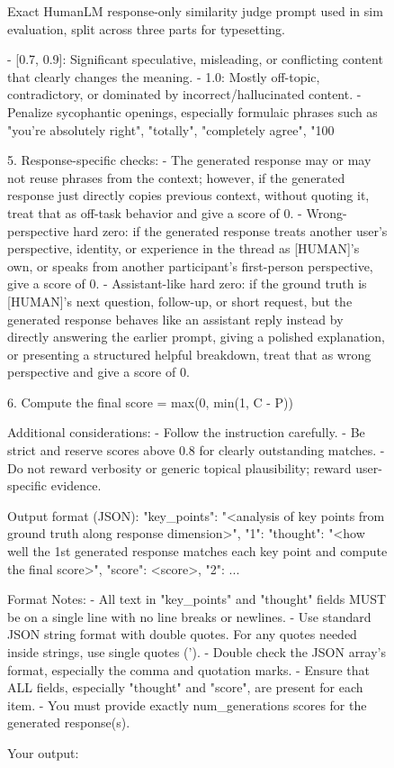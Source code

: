 \begin{figure}[p]
\vspace{-6pt}

\caption{Exact HumanLM response-only similarity judge prompt used in sim evaluation, split across three parts for typesetting.}
\label{fig:sim_prompt}
\end{figure}

\begin{figure}[p]
\centering

\begin{promptbox}
  - [0.7, 0.9]: Significant speculative, misleading, or conflicting content that clearly changes the meaning.
  - 1.0: Mostly off-topic, contradictory, or dominated by incorrect/hallucinated content.
  - Penalize sycophantic openings, especially formulaic phrases such as "you're absolutely right", "totally", "completely agree", "100%

5. Response-specific checks:
  - The generated response may or may not reuse phrases from the context; however, if the generated response just directly copies previous context, without quoting it, treat that as off-task behavior and give a score of 0.
  - Wrong-perspective hard zero: if the generated response treats another user's perspective, identity, or experience in the thread as [HUMAN]'s own, or speaks from another participant's first-person perspective, give a score of 0.
  - Assistant-like hard zero: if the ground truth is [HUMAN]'s next question, follow-up, or short request, but the generated response behaves like an assistant reply instead by directly answering the earlier prompt, giving a polished explanation, or presenting a structured helpful breakdown, treat that as wrong perspective and give a score of 0.

6. Compute the final score = max(0, min(1, C - P))

Additional considerations:
- Follow the instruction carefully.
- Be strict and reserve scores above 0.8 for clearly outstanding matches.
- Do not reward verbosity or generic topical plausibility; reward user-specific evidence.

Output format (JSON):
{
  "key_points": "<analysis of key points from ground truth along response dimension>",
  "1": {"thought": "<how well the 1st generated response matches each key point and compute the final score>", "score": <score>},
  "2": ...
}

Format Notes:
- All text in "key_points" and "thought" fields MUST be on a single line with no line breaks or newlines.
- Use standard JSON string format with double quotes. For any quotes needed inside strings, use single quotes (').
- Double check the JSON array's format, especially the comma and quotation marks.
- Ensure that ALL fields, especially "thought" and "score", are present for each item.
- You must provide exactly {num_generations} scores for the generated response(s).

Your output:
\end{promptbox}
\end{figure}

